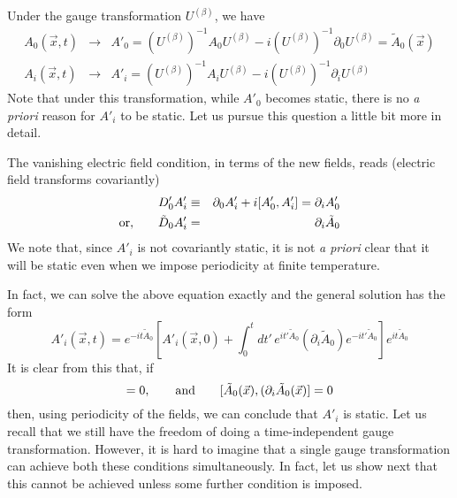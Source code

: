 \documentclass[a4paper,12pt]{article}
\begin{document}
Under the gauge transformation $U^{(\beta)}$, we have
\begin{eqnarray}
A_{0}(\vec{x},t) & \rightarrow & A'_{0} =
(U^{(\beta)})^{-1}A_{0}U^{(\beta)} - i (U^{(\beta)})^{-1}\partial_{0}
U^{(\beta)} = \tilde{A}_{0}(\vec{x})\nonumber\\
A_{i}(\vec{x},t) & \rightarrow & A'_{i} = (U^{(\beta)})^{-1} A_{i}
U^{(\beta)} - i (U^{(\beta)})^{-1}\partial_{i}U^{(\beta)}
\end{eqnarray}
Note that under this transformation, while  $A'_{0}$ becomes static,
there is no {\em a priori} reason for $A'_{i}$ to be static. Let us
pursue this question a little bit more in detail.

The vanishing electric field condition, in terms of the new fields,
reads (electric field transforms covariantly)
\begin{eqnarray}
D'_{0}A'_{i} & \equiv & \partial_{0}A'_{i} + i[A'_{0},A'_{i}] =
\partial_{i}A'_{0}\nonumber\\
{\rm or,}\qquad \tilde{D}_{0}A'_{i} & = & \partial_{i}\tilde{A}_{0}
\end{eqnarray}
We note that, since $A'_{i}$ is not covariantly static, it is not {\em
a priori} clear that it will be static even when we impose 
periodicity at finite temperature. 

In fact, we can solve the above equation exactly and the general
solution has the form
\begin{equation}
A'_{i}(\vec{x},t) = e^{-it\tilde{A}_{0}}\left[A'_{i}(\vec{x},0) +
\int_{0}^{t}dt'\, e^{it'\tilde{A}_{0}} (\partial_{i}\tilde{A}_{0})
e^{-it'\tilde{A}_{0}} \right] e^{it\tilde{A}_{0}}
\end{equation}
It is clear from this that, if
\begin{equation}
[\tilde{A}_{0}(\vec{x}), A'_{i}(\vec{x},0)] = 0,\qquad {\rm and}\qquad
[\tilde{A}_{0}(\vec{x}),(\partial_{i}\tilde{A}_{0}(\vec{x})] = 0
\end{equation}
then, using periodicity of the fields, we can conclude that $A'_{i}$
is static. Let us recall that we still have the freedom of doing a
time-independent gauge transformation. However, it is hard to imagine
that a single gauge transformation can achieve both these conditions
simultaneously. In fact, let us show next that this cannot be achieved
unless some further condition is imposed.
\end{document}
